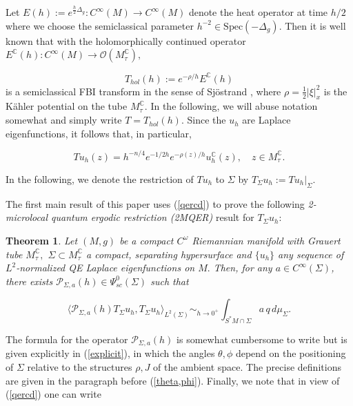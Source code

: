 \documentclass[11pt,reqno]{amsart}
\newcommand{\C}{{\mathbb C}}
\newtheorem{theorem}{Theorem}
\theoremstyle{definition}
\begin{document}
Let $E(h):=e^{\frac{h}{2} \Delta_g}: C^{\infty}(M) \to C^{\infty}(M)$ denote the heat operator at time $h/2$ where we choose the semiclassical parameter $h^{-2} \in \text{Spec}(-\Delta_g).$ Then it is well known that \cite{GLS96} with the holomorphically continued operator $E^{\C}(h): C^{\infty}(M) \to {\mathcal O}(M_{\tau}^{\C}),$

$$
T_{hol}(h):= e^{-\rho/h} E^{\C}(h)
$$
is a semiclassical FBI transform in the sense of Sj\"{o}strand \cite{S82}, where $\rho = \frac{1}{2} |\xi|_{x}^2$ is the K\"{a}hler potential on the tube $M_{\tau}^{\C}.$ In the following,  we will abuse notation somewhat and simply write $T = T_{hol}(h).$
Since the $u_h$ are Laplace eigenfunctions, it follows that, in particular,
 

 
 
\begin{equation}\label{Tu_h}
    Tu_h(z)=h^{-n/4}e^{-1/2h}e^{-\rho(z)/h}u_h^{\mathbb{C}}(z),\quad  z\in M^\C_\tau.
\end{equation}

In the following, we denote the restriction of $Tu_h$ to $\Sigma$  by $T_{\Sigma} u_h := T u_h |_{\Sigma}.$

The first main result of this paper uses (\ref{qercd}) to prove the following {\em 2-microlocal quantum ergodic restriction (2MQER)} result for $T_{\Sigma} u_h:$

\begin{theorem} \label{thm1}
Let $(M,g)$ be a compact $C^{\omega}$ Riemannian manifold with Grauert tube $M_{\tau}^{\C},$    $\Sigma \subset M_{\tau}^{\C}$  a compact, separating hypersurface and $\{ u_h \}$ any sequence of $L^2$-normalized  QE Laplace eigenfunctions on $M.$ Then,  for any $a \in C^{\infty}(\Sigma)$, there exists ${\mathcal P}_{\Sigma,a}(h) \in \Psi_{sc}^{0}(\Sigma)$ such that

$$
\langle {\mathcal P}_{\Sigma, a}(h) T_{\Sigma}u_h, T_{\Sigma}u_h \rangle_{L^2(\Sigma)}  \sim_{h \to 0^+} \int_{S^*M \cap \Sigma} a\,q\,d\mu_{\Sigma}.
$$
\end{theorem}

The formula for the operator ${\mathcal P}_{\Sigma, a}(h)$ is somewhat cumbersome to write but is given explicitly in (\ref{explicit}), in which the angles $\theta,\phi$ depend on the positioning of $\Sigma$ relative to the structures $\rho,J$ of the ambient space. The precise definitions are given in the paragraph before (\ref{theta,phi}). Finally, we note that in view of (\ref{qercd}) one can write
\end{document}
